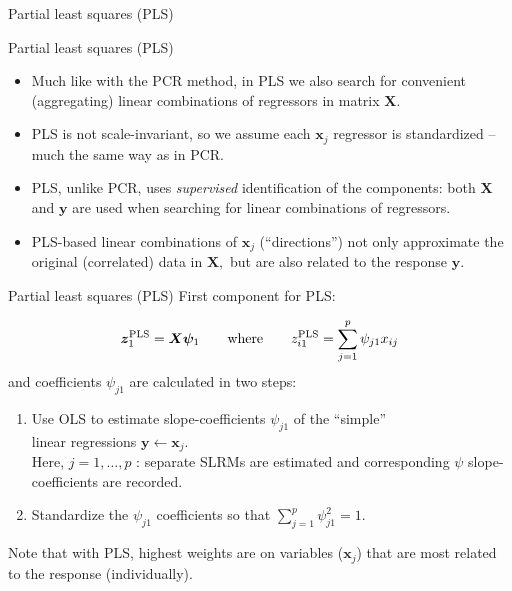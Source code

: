 \documentclass{beamer}
\begin{document}
\begin{frame}{Partial least squares (PLS)}
\end{frame}
\begin{frame}{Partial least squares (PLS)}
\begin{itemize}
\item Much like with the PCR method, in PLS we also search for convenient (aggregating) linear combinations of regressors in matrix $\bm{X}$.\\
\medskip
\item PLS is not scale-invariant, so we assume each $\bm{x}_j$ regressor is standardized -- much the same way as in PCR.\\
\medskip
\item PLS, unlike PCR, uses \textit{supervised} identification of the components: both $\bm{X}$ and $\bm{y}$ are used when searching for linear combinations of regressors.\\
\medskip
\item PLS-based linear combinations of $\bm{x}_j$ (``directions'') not only approximate the original (correlated) data in $\bm{X},$ but are also related to the response $\bm{y}$.
\end{itemize}
\end{frame}
\begin{frame}{Partial least squares (PLS)}
First component for PLS:

$$ \bm{z}_1^{\textnormal{PLS}} = \bm{X\psi}_1 \qquad \textnormal{where} \qquad 
z_{i1}^{\textnormal{PLS}} = \sum_{j=1}^p \psi_{j1} x_{ij}$$
\medskip
and coefficients $\psi_{j1}$ are calculated in two steps:
\begin{enumerate}
\item Use OLS to estimate slope-coefficients $\psi_{j1}$ of the ``simple'' \\linear regressions $\bm{y} \leftarrow \bm{x}_j$.\\ \smallskip Here, $j=1,\dots,p$ : separate SLRMs are estimated and corresponding $\psi$ slope-coefficients are recorded.
\medskip
\item Standardize the $\psi_{j1}$ coefficients so that $\sum_{j=1}^p \psi_{j1}^2=1$.
\end{enumerate}
\bigskip
Note that with PLS, highest weights are on variables ($\bm{x}_j$) that are most related to the response (individually). 
\end{frame}
\end{document}
